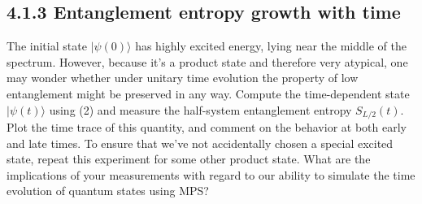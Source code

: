 \documentclass[12pt]{article}
\begin{document}
\subsection*{4.1.3 Entanglement entropy growth with time}
The initial state $|\psi(0)\rangle$ has highly excited energy, lying near the middle of the spectrum. However, because it's a product state and therefore very atypical, one may wonder whether under unitary time evolution the property of low entanglement might be preserved in any way. Compute the time-dependent state $|\psi(t)\rangle$ using (2) and measure the half-system entanglement entropy $S_{L / 2}(t)$. Plot the time trace of this quantity, and comment on the behavior at both early and late times. To ensure that we've not accidentally chosen a special excited state, repeat this experiment for some other product state. What are the implications of your measurements with regard to our ability to simulate the time evolution of quantum states using MPS?
\newpage
\end{document}
